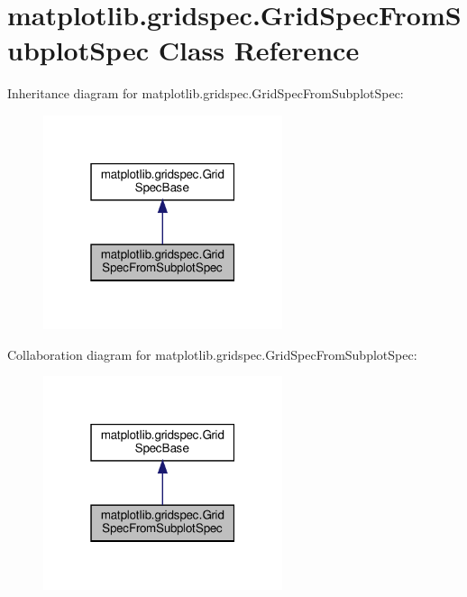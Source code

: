 \hypertarget{classmatplotlib_1_1gridspec_1_1GridSpecFromSubplotSpec}{}\section{matplotlib.\+gridspec.\+Grid\+Spec\+From\+Subplot\+Spec Class Reference}
\label{classmatplotlib_1_1gridspec_1_1GridSpecFromSubplotSpec}


Inheritance diagram for matplotlib.\+gridspec.\+Grid\+Spec\+From\+Subplot\+Spec\+:
\nopagebreak
\begin{figure}[H]
\begin{center}
\leavevmode
\includegraphics[width=199pt]{classmatplotlib_1_1gridspec_1_1GridSpecFromSubplotSpec__inherit__graph}
\end{center}
\end{figure}


Collaboration diagram for matplotlib.\+gridspec.\+Grid\+Spec\+From\+Subplot\+Spec\+:
\nopagebreak
\begin{figure}[H]
\begin{center}
\leavevmode
\includegraphics[width=199pt]{classmatplotlib_1_1gridspec_1_1GridSpecFromSubplotSpec__coll__graph}
\end{center}
\end{figure}
